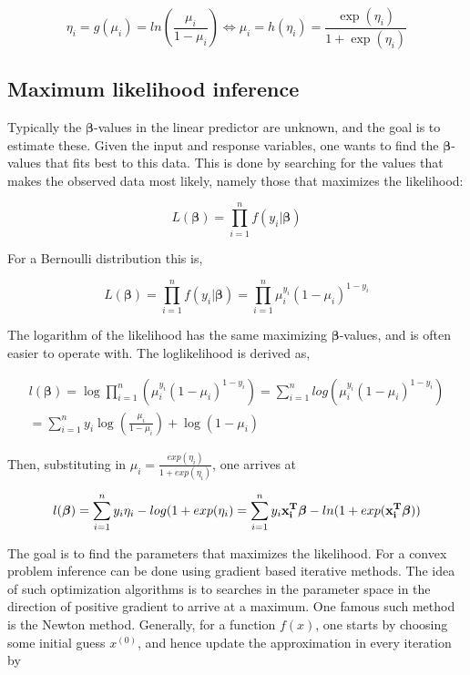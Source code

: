 \begin{equation}
    \eta_i = g(\mu_i) = ln(\frac{\mu_i}{1-\mu_i}) \Leftrightarrow 
    \mu_i = h(\eta_i) = \frac{\exp(\eta_i)}{1+\exp(\eta_i)}
\end{equation}


\subsection{Maximum likelihood inference}
\label{sec:Inference}

Typically the $\bm {\beta}$-values in the linear predictor are unknown, and the goal is to estimate these. Given the input and response variables, one wants to find the $\bm {\beta}$-values that fits best to this data. This is done by searching for the values that makes the observed data most likely, namely those that maximizes the likelihood:

\begin{equation}
    L(\bm{\beta}) = \prod_{i=1}^{n} f(y_i |\bm{ \beta})
\end{equation}

For a Bernoulli distribution this is,

\begin{equation}
    L(\bm{\beta}) = \prod_{i=1}^{n} f(y_i |\bm{ \beta}) = \prod_{i=1}^{n} \mu_i^{y_i}(1-\mu_i)^{1-y_i}
\end{equation}

The logarithm of the likelihood has the same maximizing $\bm{\beta}$-values, and is often easier to operate with. The loglikelihood is derived as,

\begin{equation}
\begin{split}
    l(\bm{\beta}) = \log \prod_{i=1}^{n} (\mu_i^{y_i}(1-\mu_i)^{1-y_i})  =
    \sum_{i=1}^n log (\mu_i^{y_i}(1-\mu_i)^{1-y_i})\\ =  \sum_{i=1}^{n} y_i \log(\frac{\mu_i}{1-\mu_i}) + \log(1-\mu_i)
\end{split}
\end{equation}

Then, substituting in $\mu_i = \frac{exp(\eta_i)}{1+exp(\eta_i)}$, one arrives at

\begin{equation}
    l(\bm{\beta}) = \sum_{i=1}^{n} y_i \eta_i - log(1 + exp(\eta_i) = \sum_{i=1}^n y_i{\bf x_i^T} \bm{ \beta} - ln(1 + exp(\bf x_i^T \bm{ \beta}))
\end{equation}

The goal is to find the parameters that maximizes the likelihood. For a convex problem inference can be done using gradient based iterative methods. The idea of such optimization algorithms is to searches in the parameter space in the direction of positive gradient to arrive at a maximum. One famous such method is the Newton method. Generally, for a function $f(x)$, one starts by choosing some initial guess $x^{(0)}$, and hence update the approximation in every iteration by

